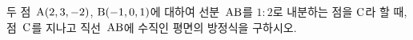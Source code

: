 두 점~$\mathrm{A}(2{,}\mkern3mu\mathopen{}3{,}\mkern3mu\mathopen{}-2)$, $\mathrm{B}(-1{,}\mkern3mu\mathopen{}0{,}\mkern3mu\mathopen{}1)$에 대하여 선분~$\mathrm{AB}$를 $1:2$로 내분하는 점을 $\mathrm{C}$라 할 때, 점~$\mathrm{C}$를 지나고 직선~$\mathrm{AB}$에 수직인 평면의 방정식을 구하시오.

